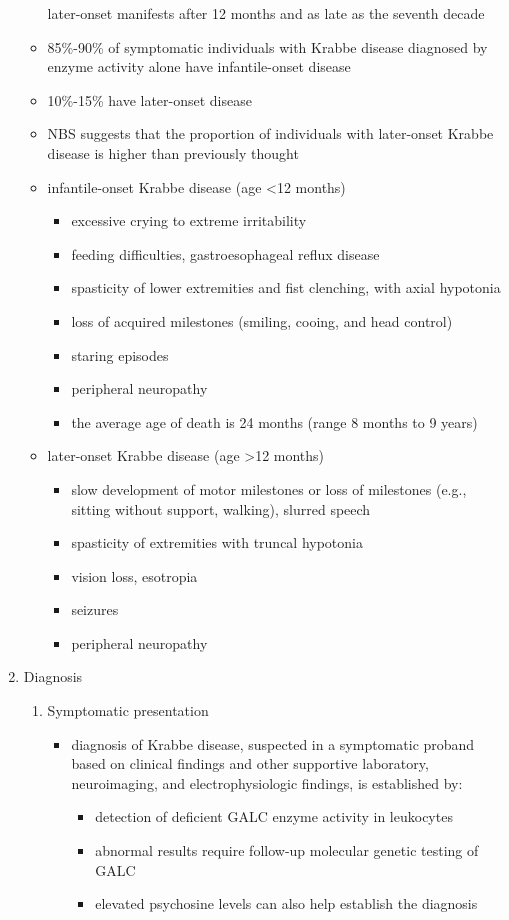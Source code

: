 \documentclass{scrartcl}
\begin{document}
\begin{enumerate}
\begin{itemize}
\item[{later-onset}] manifests after 12 months and as late as the seventh
decade

\item 85\%-90\% of symptomatic individuals with Krabbe disease diagnosed by enzyme activity alone have infantile-onset disease
\item 10\%-15\% have later-onset disease
\item NBS suggests that the proportion of individuals with later-onset
Krabbe disease is higher than previously thought

\item infantile-onset Krabbe disease (age <12 months)
\begin{itemize}
\item excessive crying to extreme irritability
\item feeding difficulties, gastroesophageal reflux disease
\item spasticity of lower extremities and fist clenching, with axial hypotonia
\item loss of acquired milestones (smiling, cooing, and head control)
\item staring episodes
\item peripheral neuropathy
\item the average age of death is 24 months (range 8 months to 9 years)
\end{itemize}

\item later-onset Krabbe disease (age >12 months)
\begin{itemize}
\item slow development of motor milestones or loss of milestones (e.g.,
sitting without support, walking), slurred speech
\item spasticity of extremities with truncal hypotonia
\item vision loss, esotropia
\item seizures
\item peripheral neuropathy
\end{itemize}
\end{itemize}

\item Diagnosis
\label{sec:org618285f}
\begin{enumerate}
\item Symptomatic presentation
\label{sec:org9f4f227}
\begin{itemize}
\item diagnosis of Krabbe disease, suspected in a symptomatic proband
based on clinical findings and other supportive laboratory,
neuroimaging, and electrophysiologic findings, is established by:
\begin{itemize}
\item detection of deficient GALC enzyme activity in leukocytes
\item abnormal results require follow-up molecular genetic testing of GALC
\item elevated psychosine levels can also help establish the diagnosis
\end{itemize}
\end{itemize}


\end{enumerate}
\end{enumerate}
\end{document}
